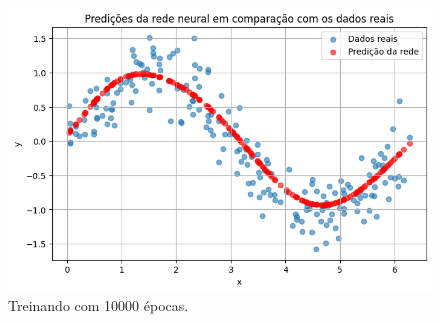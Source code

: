 \begin{figure}[htb]
\begin{minipage}{0.45\textwidth}
        \centering
        \caption{Treinando com 10000 épocas.} \label{tarefa02:10000:predicoes}
        \includegraphics[width=\textwidth]{./0803_imgs/png-241110-154812342-18762265025268743.png}
    \end{minipage}
\end{figure}
